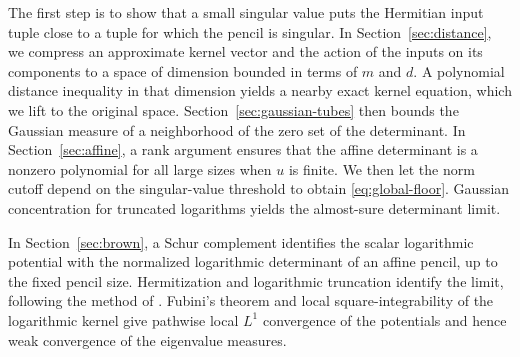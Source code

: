 The first step is to show that a small singular value puts the Hermitian input tuple close to a tuple for which the pencil is singular.
In Section~\ref{sec:distance}, we compress an approximate kernel vector and the action of the inputs on its components to a space of dimension bounded in terms of $m$ and $d$.
A polynomial distance inequality in that dimension yields a nearby exact kernel equation, which we lift to the original space.
Section~\ref{sec:gaussian-tubes} then bounds the Gaussian measure of a neighborhood of the zero set of the determinant.
In Section~\ref{sec:affine}, a rank argument ensures that the affine determinant is a nonzero polynomial for all large sizes when $u$ is finite.
We then let the norm cutoff depend on the singular-value threshold to obtain \eqref{eq:global-floor}.
Gaussian concentration for truncated logarithms yields the almost-sure determinant limit.

In Section~\ref{sec:brown}, a Schur complement identifies the scalar logarithmic potential with the normalized logarithmic determinant of an affine pencil, up to the fixed pencil size.
Hermitization and logarithmic truncation identify the limit, following the method of \cite[Section~5]{Han26}.
Fubini's theorem and local square-integrability of the logarithmic kernel give pathwise local $L^1$ convergence of the potentials and hence weak convergence of the eigenvalue measures.
